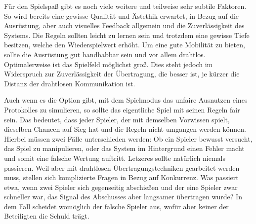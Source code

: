 Für den Spielspaß gibt es noch viele weitere und teilweise sehr subtile
Faktoren. So wird bereits eine gewisse Qualität und Ästethik erwartet, in
Bezug auf die Ausrüstung, aber auch visuelles Feedback allgemein und die
Zuverlässigkeit des Systems. Die Regeln sollten leicht zu lernen sein und
trotzdem eine gewisse Tiefe besitzen, welche den Wiederspielwert erhöht.
Um eine gute Mobilität zu bieten, sollte die Ausrüstung gut handhabbar sein
und vor allem drahtlos. Optimalerweise ist das Spielfeld möglichst groß. Dies
steht jedoch im Widerspruch zur Zuverlässigkeit der Übertragung, die besser ist,
je kürzer die Distanz der drahtlosen Kommunikation ist.

Auch wenn es die Option gibt, mit dem Spielmodus das unfaire Ausnutzen eines
Protokolles zu simulieren, so sollte das eigentliche Spiel mit seinen Regeln
fair sein. Das bedeutet, dass jeder Spieler, der mit demselben Vorwissen spielt,
dieselben Chancen auf Sieg hat und die Regeln nicht umgangen werden können.
Hierbei müssen zwei Fälle unterschieden werden: Ob ein Spieler bewusst versucht,
das Spiel zu manipulieren, oder das System im Hintergrund einen Fehler macht
und somit eine falsche Wertung auftritt. Letzeres sollte natürlich niemals
passieren. Weil aber mit drahtlosen Übertragungstechniken gearbeitet werden
muss, stellen sich komplizierte Fragen in Bezug auf Konkurrenz. Was passiert
etwa, wenn zwei Spieler sich gegenseitig abschießen und der eine Spieler
zwar schneller war, das Signal des Abschusses aber langsamer übertragen wurde?
In dem Fall scheidet womöglich der falsche Spieler aus, wofür aber keiner der
Beteiligten die Schuld trägt.
